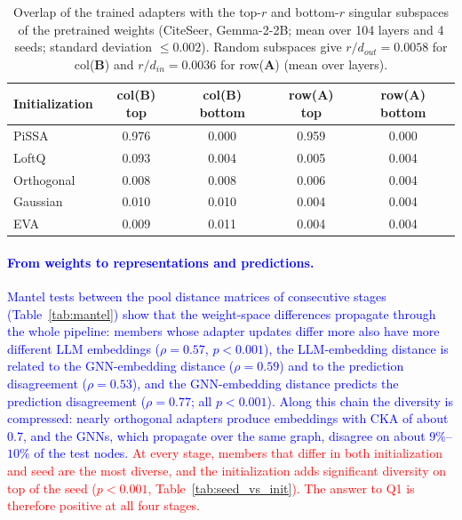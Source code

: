 \documentclass[a4paper,fleqn]{cas-sc}
\newcommand{\revone}[1]{\textcolor{red}{#1}}   %
\newcommand{\revtwo}[1]{\textcolor{blue}{#1}}  %
\begin{document}
\begin{table}[htbp]
\centering\color{blue}
\caption{Overlap of the trained adapters with the top-$r$ and bottom-$r$ singular subspaces of the pretrained weights (CiteSeer, Gemma-2-2B; mean over 104 layers and 4 seeds; standard deviation $\leq 0.002$). Random subspaces give $r/d_{out}=0.0058$ for col($\mathbf{B}$) and $r/d_{in}=0.0036$ for row($\mathbf{A}$) (mean over layers).}
\label{tab:spectral}
\small
\begin{tabular}{lcccc}
\toprule
\textbf{Initialization} & \textbf{col($\mathbf{B}$) top} & \textbf{col($\mathbf{B}$) bottom} & \textbf{row($\mathbf{A}$) top} & \textbf{row($\mathbf{A}$) bottom} \\
\midrule
PiSSA      & 0.976 & 0.000 & 0.959 & 0.000 \\
LoftQ      & 0.093 & 0.004 & 0.005 & 0.004 \\
Orthogonal & 0.008 & 0.008 & 0.006 & 0.004 \\
Gaussian   & 0.010 & 0.010 & 0.004 & 0.004 \\
EVA        & 0.009 & 0.011 & 0.004 & 0.004 \\
\bottomrule
\end{tabular}
\end{table}

\paragraph{\revtwo{From weights to representations and predictions.}}
\revtwo{Mantel tests \citep{mantel1967} between the pool distance matrices of consecutive stages (Table~\ref{tab:mantel}) show that the weight-space differences propagate through the whole pipeline: members whose adapter updates differ more also have more different LLM embeddings ($\rho=0.57$, $p<0.001$), the LLM-embedding distance is related to the GNN-embedding distance ($\rho=0.59$) and to the prediction disagreement ($\rho=0.53$), and the GNN-embedding distance predicts the prediction disagreement ($\rho=0.77$; all $p<0.001$). Along this chain the diversity is compressed: nearly orthogonal adapters produce embeddings with CKA of about $0.7$, and the GNNs, which propagate over the same graph, disagree on about $9\%$--$10\%$ of the test nodes.} \revone{At every stage, members that differ in both initialization and seed are the most diverse, and the initialization adds significant diversity on top of the seed ($p<0.001$, Table~\ref{tab:seed_vs_init}). The answer to Q1 is therefore positive at all four stages.}
\end{document}
